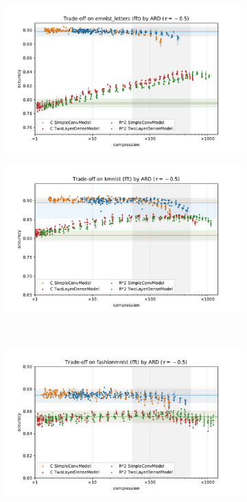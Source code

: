 \documentclass[a4paper,10pt]{article}
\begin{document}
\begin{figure}[b]
  \centering
  \begin{subfigure}[b]{0.5\textwidth}
    \centering
    \includegraphics[width=\linewidth]{figure__mnist-like__trade-off/appendix__cmp__ARD__emnist_letters__fft__-0.5.pdf}
  \end{subfigure}%
  \begin{subfigure}[b]{0.5\textwidth}
    \centering
    \includegraphics[width=\linewidth]{figure__mnist-like__trade-off/appendix__cmp__ARD__kmnist__fft__-0.5.pdf}
  \end{subfigure} \\ %
  \begin{subfigure}[b]{0.5\textwidth}
    \centering
    \includegraphics[width=\linewidth]{figure__mnist-like__trade-off/appendix__cmp__ARD__fashionmnist__fft__-0.5.pdf}

\end{subfigure}
\end{figure}
\end{document}
